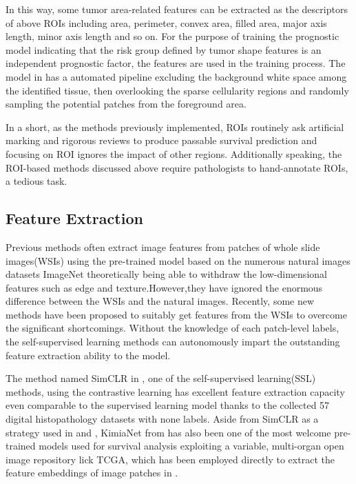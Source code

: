 \documentclass[journal,twoside,web]{ieeecolor}
\begin{document}
In this way, some tumor area-related features can be extracted as the descriptors of above ROIs including area, perimeter, convex area, filled area, major axis length, minor axis length and so on.
For the purpose of training the prognostic model indicating that the risk group defined by tumor shape features is an independent prognostic factor, the features are used in the training process.
The model in \cite{mackenzie2022neural} has a automated pipeline excluding the background white space among the identified tissue, then overlooking the sparse cellularity regions and randomly sampling the potential patches from the foreground area.

In a short, as the methods previously implemented, ROIs routinely ask artificial marking and rigorous reviews to produce passable survival prediction and focusing on ROI ignores the impact of other regions.
Additionally speaking, the ROI-based methods discussed above require pathologists to hand-annotate ROIs, a tedious task.

\subsection{Feature Extraction}
Previous methods often extract image features from patches of whole slide images(WSIs) using the pre-trained model based on the numerous natural images datasets ImageNet theoretically being able to withdraw the low-dimensional features such as edge and texture.However,they have ignored the enormous difference between the WSIs and the natural images.
Recently, some new methods have been proposed to suitably get features from the WSIs to overcome the significant shortcomings.
Without the knowledge of each patch-level labels, the self-supervised learning methods can autonomously impart the outstanding feature extraction ability to the model.

The method named SimCLR in \cite{ciga2022self}, one of the self-supervised learning(SSL) methods, using the contrastive learning has excellent feature extraction capacity even comparable to the supervised learning model thanks to the collected 57 digital histopathology datasets with none labels.
Aside from SimCLR as a strategy used in \cite{benkirane2022hyper} and \cite{li2021dual}, KimiaNet from \cite{riasatian2021fine} has also been one of the most welcome pre-trained models used for survival analysis exploiting a variable, multi-organ open image repository lick TCGA, which has been employed directly to extract the feature embeddings of image patches in \cite{guo2023higt} \cite{li2021dual}.
\end{document}
